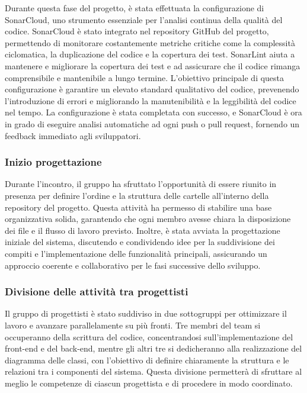 \par Durante questa fase del progetto, è stata effettuata la configurazione di SonarCloud, uno strumento essenziale per l'analisi continua della qualità del codice. SonarCloud è stato integrato nel repository GitHub del progetto, permettendo di monitorare costantemente metriche critiche come la complessità ciclomatica, la duplicazione del codice e la copertura dei test. SonarLint aiuta a mantenere e migliorare la copertura dei test e ad assicurare che il codice rimanga comprensibile e mantenibile a lungo termine. L'obiettivo principale di questa configurazione è garantire un elevato standard qualitativo del codice, prevenendo l'introduzione di errori e migliorando la manutenibilità e la leggibilità del codice nel tempo. La configurazione è stata completata con successo, e SonarCloud è ora in grado di eseguire analisi automatiche ad ogni push o pull request, fornendo un feedback immediato agli sviluppatori.


\subsubsection{Inizio progettazione}
\par Durante l'incontro, il gruppo ha sfruttato l'opportunità di essere riunito in presenza per definire l'ordine e la struttura delle cartelle all'interno della repository del progetto. Questa attività ha permesso di stabilire una base organizzativa solida, garantendo che ogni membro avesse chiara la disposizione dei file e il flusso di lavoro previsto. Inoltre, è stata avviata la progettazione iniziale del sistema, discutendo e condividendo idee per la suddivisione dei compiti e l'implementazione delle funzionalità principali, assicurando un approccio coerente e collaborativo per le fasi successive dello sviluppo.


\subsubsection{Divisione delle attività tra progettisti}
\par Il gruppo di progettisti è stato suddiviso in due sottogruppi per ottimizzare il lavoro e avanzare parallelamente su più fronti. Tre membri del team si occuperanno della scrittura del codice, concentrandosi sull'implementazione del front-end e del back-end, mentre gli altri tre si dedicheranno alla realizzazione del diagramma delle classi, con l'obiettivo di definire chiaramente la struttura e le relazioni tra i componenti del sistema. Questa divisione permetterà di sfruttare al meglio le competenze di ciascun progettista e di procedere in modo coordinato.


